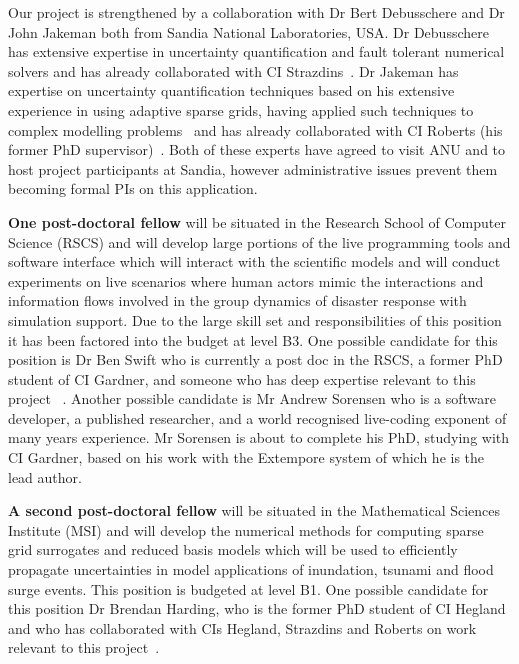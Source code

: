 Our project is strengthened by a collaboration  with Dr
Bert Debusschere and Dr John Jakeman both from Sandia National
Laboratories, USA. Dr Debusschere
has extensive expertise in uncertainty quantification and fault
tolerant numerical solvers and has already collaborated with CI
Strazdins~\parencite{parSGCT16}.  
Dr Jakeman has expertise on uncertainty
quantification techniques based on his extensive experience in using
adaptive sparse grids, having applied such techniques to complex
modelling problems~\parencite{JakemanRoberts2013,jakemanNumerical2010,
  Jakeman2015} and has already collaborated with CI Roberts (his
former PhD supervisor)~\parencite{JakemanRoberts2013}.  Both of these experts have
agreed to visit ANU and to host project participants at Sandia, however administrative 
issues prevent them becoming formal PIs on this application.

\iffalse
Both  Dr Debusschere and Dr Jakeman
have offered to host visits from our group to the Livermore and
Albuquerque Sandia Laboratories. We plan to support reciprocal visits
to ANU.
\fi

{\bf One post-doctoral fellow} will be situated in the Research School
of Computer Science (RSCS) and will develop large portions of the live
programming tools and software interface which will interact with the
scientific models and will conduct experiments on live scenarios where
human actors mimic the interactions and information flows involved in
the group dynamics of disaster response with simulation support. Due
to the large skill set and responsibilities of this position it has
been factored into the budget at level B3.  One possible candidate for
this position is Dr Ben Swift who is currently a post doc in the RSCS, a
former PhD student of CI Gardner, and someone who has
deep expertise relevant to this project
~\parencite{martin2015tracking,martin2016intelligent,swiftLive2016,
  swift2013visual,swift2014coding}. Another possible candidate is Mr 
  Andrew Sorensen who is a software developer, a published researcher, and a
   world recognised live-coding exponent of many years experience. 
  Mr Sorensen is about to complete his PhD, studying with CI Gardner, based
  on his work with the Extempore system of which he is the lead author.

{\bf A second post-doctoral fellow} will be situated in the
Mathematical Sciences Institute (MSI) and will develop the numerical methods for computing
sparse grid surrogates and reduced basis models which will be used to
efficiently propagate uncertainties in model applications of inundation, tsunami
and flood surge events. This position is budgeted at level B1.  One possible candidate for this position Dr Brendan Harding, who 
is the former PhD student of CI Hegland and who has
collaborated with CIs Hegland, Strazdins and Roberts on work
relevant to this project~\parencite{Ali11022016, AliEtal2015,
  deBaarHarding2015, HardingHLS2015, sgctalg15}.


